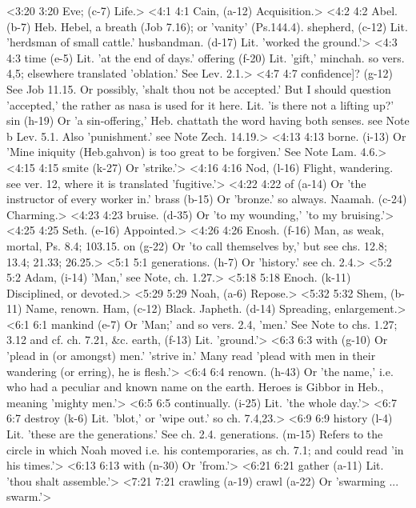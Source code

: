 <3:20 3:20  Eve; (c-7)  Life.>
<4:1 4:1  Cain, (a-12)  Acquisition.>
<4:2 4:2  Abel. (b-7)  Heb. Hebel, a breath (Job 7.16); or 'vanity' (Ps.144.4).
  shepherd, (c-12)  Lit. 'herdsman of small cattle.'
  husbandman. (d-17)  Lit. 'worked the ground.'>
<4:3 4:3  time (e-5)  Lit. 'at the end of days.'
  offering (f-20)  Lit. 'gift,' minchah. so vers. 4,5; elsewhere translated  'oblation.' See Lev. 2.1.>
<4:7 4:7  confidence]? (g-12)  See Job 11.15. Or possibly, 'shalt thou not be accepted.' But  I should question 'accepted,' the rather as nasa is used for  it here. Lit. 'is there not a lifting up?'
  sin (h-19)  Or 'a sin-offering,' Heb. chattath the word having both  senses. see Note b Lev. 5.1. Also 'punishment.' see Note  Zech. 14.19.>
<4:13 4:13  borne. (i-13)  Or 'Mine iniquity (Heb.gahvon) is too great to be  forgiven.' See Note Lam. 4.6.>
<4:15 4:15  smite (k-27)  Or 'strike.'>
<4:16 4:16  Nod, (l-16)  Flight, wandering. see ver. 12, where it is translated  'fugitive.'>
<4:22 4:22  of (a-14)  Or 'the instructor of every worker in.'
  brass (b-15)  Or 'bronze.' so always.
  Naamah. (c-24)  Charming.>
<4:23 4:23  bruise. (d-35)  Or 'to my wounding,' 'to my bruising.'>
<4:25 4:25  Seth. (e-16)  Appointed.>
<4:26 4:26  Enosh. (f-16)  Man, as weak, mortal, Ps. 8.4; 103.15.
  on (g-22)  Or 'to call themselves by,' but see chs. 12.8; 13.4; 21.33;  26.25.>
<5:1 5:1  generations. (h-7)  Or 'history.' see ch. 2.4.>
<5:2 5:2  Adam, (i-14)  'Man,' see Note, ch. 1.27.>
<5:18 5:18  Enoch. (k-11)  Disciplined, or devoted.>
<5:29 5:29  Noah, (a-6)  Repose.>
<5:32 5:32  Shem, (b-11)  Name, renown.
  Ham, (c-12)  Black.
  Japheth. (d-14)  Spreading, enlargement.>
<6:1 6:1  mankind (e-7)  Or 'Man;' and so vers. 2.4, 'men.' See Note to chs. 1.27;  3.12 and cf. ch. 7.21, &c.
  earth, (f-13)  Lit. 'ground.'>
<6:3 6:3  with (g-10)  Or 'plead in (or amongst) men.' 'strive in.' Many read 'plead  with men in their wandering (or erring), he is flesh.'>
<6:4 6:4  renown. (h-43)  Or 'the name,' i.e. who had a peculiar and known name on the  earth. Heroes is Gibbor in Heb., meaning 'mighty men.'>
<6:5 6:5  continually. (i-25)  Lit. 'the whole day.'>
<6:7 6:7  destroy (k-6)  Lit. 'blot,' or 'wipe out.' so ch. 7.4,23.>
<6:9 6:9  history (l-4)  Lit. 'these are the generations.' See ch. 2.4.
  generations. (m-15)  Refers to the circle in which Noah moved i.e. his  contemporaries, as ch. 7.1; and could read 'in his times.'>
<6:13 6:13  with (n-30)  Or 'from.'>
<6:21 6:21  gather (a-11)  Lit. 'thou shalt assemble.'>
<7:21 7:21  crawling (a-19)  crawl (a-22)
  Or 'swarming ... swarm.'>
